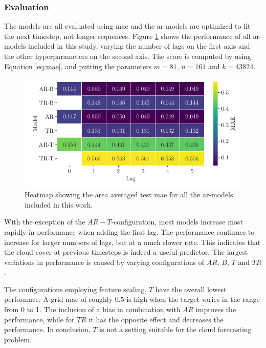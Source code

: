 \subsubsection{Evaluation}
The models are all evaluated using \acrfull{mae} and the \acrshort{ar}-models are optimized to fit the next timestep, not longer sequences. Figure \ref{fig:heatmap_ar_models} shows the performance of all \acrshort{ar}-models included in this study, varying the number of lags on the first axis and the other hyperparameters on the second axis. The score is computed by using Equation \eqref{eq:mae}, and putting the parameters $m = 81$, $n=161$ and $k=43824$. 
\begin{figure}
    \centering
    \includegraphics{python_figs/heat_ar_model_mae_test_score.png}
    \caption{Heatmap showing the area averaged test \acrshort{mae} for all the \acrshort{ar}-models included in this work. %
    }
    \label{fig:heatmap_ar_models}
\end{figure}
With the exception of the $AR-T$-configuration, most models increase most rapidly in performance when adding the first lag. The performance continues to increase for larger numbers of lags, but at a much slower rate. This indicates that the cloud cover at previous timesteps is indeed a useful predictor. The largest variations in performance is caused by varying configurations of $AR$, $B$, $T$ and $TR$. 

The configurations employing feature scaling, $T$ have the overall lowest performace. A grid \acrshort{mae} of roughly $0.5$ is high when the target varies in the range from 0 to 1. The inclusion of a bias in combination with $AR$ improves the performance, while for $TR$ it has the opposite effect and decreases the performance. In conclusion, $T$ is not a setting suitable for the cloud forecasting problem.

